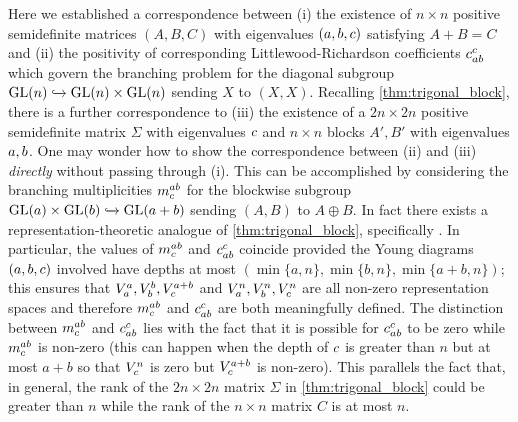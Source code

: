 \documentclass[notitlepage, 10pt]{article}
\begin{document}
Here we established a correspondence between (i) the existence of $n\times n$ positive semidefinite matrices $(A,B,C)$ with eigenvalues $(a,b,c)$ satisfying $A+B=C$ and (ii) the positivity of corresponding Littlewood-Richardson coefficients $c_{ab}^{c}$ which govern the branching problem for the diagonal subgroup $\operatorname{GL}(n) \xhookrightarrow{} \operatorname{GL}(n) \times \operatorname{GL}(n)$ sending $X$ to $(X,X)$.
Recalling \cref{thm:trigonal_block}, there is a further correspondence to (iii) the existence of a $2n \times 2n$ positive semidefinite matrix $\Sigma$ with eigenvalues $c$ and $n\times n$ blocks $A',B'$ with eigenvalues $a,b$.
One may wonder how to show the correspondence between (ii) and (iii) \textit{directly} without passing through (i).
This can be accomplished by considering the branching multiplicities $m^{ab}_{c}$ for the blockwise subgroup $\operatorname{GL}(a) \times \operatorname{GL}(b) \xhookrightarrow{} \operatorname{GL}(a+b)$ sending $(A,B)$ to $A\oplus B$.
In fact there exists a representation-theoretic analogue of \cref{thm:trigonal_block}, specifically \cite[Theorem 9.2.3]{goodman2000representations}.
In particular, the values of $m^{ab}_{c}$ and $c_{ab}^{c}$ coincide provided the Young diagrams $(a,b,c)$ involved have depths at most $(\min\{a,n\}, \min\{b,n\}, \min\{a+b,n\})$; this ensures that $V_{a}^{a}, V_{b}^{b}, V_{c}^{a+b}$ and $V_{a}^{n}, V_{b}^{n}, V_{c}^{n}$ are all non-zero representation spaces and therefore $m^{ab}_{c}$ and $c_{ab}^{c}$ are both meaningfully defined.
The distinction between $m^{ab}_{c}$ and $c_{ab}^{c}$ lies with the fact that it is possible for $c_{ab}^{c}$ to be zero while $m^{ab}_{c}$ is non-zero (this can happen when the depth of $c$ is greater than $n$ but at most $a+b$ so that $V_{c}^{n}$ is zero but $V_{c}^{a+b}$ is non-zero).
This parallels the fact that, in general, the rank of the $2n\times 2n$ matrix $\Sigma$ in \cref{thm:trigonal_block} could be greater than $n$ while the rank of the $n\times n$ matrix $C$ is at most $n$.
\end{document}
